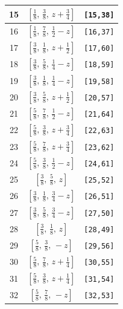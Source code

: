 \documentclass[fleqn,8pt]{jsarticle}
\begin{document}
\begin{longtable}{ccc}
15 & $\left[ \frac{1}{8},\, \frac{3}{8},\, z + \frac{3}{4} \right]$ & {\tt [15,38]} \\ \hline
16 & $\left[ \frac{1}{8},\, \frac{7}{8},\, \frac{1}{2} - z \right]$ & {\tt [16,37]} \\ \hline
17 & $\left[ \frac{3}{8},\, \frac{1}{8},\, z + \frac{1}{2} \right]$ & {\tt [17,60]} \\ \hline
18 & $\left[ \frac{3}{8},\, \frac{5}{8},\, \frac{1}{4} - z \right]$ & {\tt [18,59]} \\ \hline
19 & $\left[ \frac{3}{8},\, \frac{1}{8},\, \frac{1}{4} - z \right]$ & {\tt [19,58]} \\ \hline
20 & $\left[ \frac{3}{8},\, \frac{5}{8},\, z + \frac{1}{2} \right]$ & {\tt [20,57]} \\ \hline
21 & $\left[ \frac{5}{8},\, \frac{7}{8},\, \frac{1}{2} - z \right]$ & {\tt [21,64]} \\ \hline
22 & $\left[ \frac{5}{8},\, \frac{3}{8},\, z + \frac{3}{4} \right]$ & {\tt [22,63]} \\ \hline
23 & $\left[ \frac{5}{8},\, \frac{7}{8},\, z + \frac{3}{4} \right]$ & {\tt [23,62]} \\ \hline
24 & $\left[ \frac{5}{8},\, \frac{3}{8},\, \frac{1}{2} - z \right]$ & {\tt [24,61]} \\ \hline
25 & $\left[ \frac{3}{8},\, \frac{5}{8},\, z \right]$ & {\tt [25,52]} \\ \hline
26 & $\left[ \frac{3}{8},\, \frac{1}{8},\, \frac{3}{4} - z \right]$ & {\tt [26,51]} \\ \hline
27 & $\left[ \frac{3}{8},\, \frac{5}{8},\, \frac{3}{4} - z \right]$ & {\tt [27,50]} \\ \hline
28 & $\left[ \frac{3}{8},\, \frac{1}{8},\, z \right]$ & {\tt [28,49]} \\ \hline
29 & $\left[ \frac{5}{8},\, \frac{3}{8},\, - z \right]$ & {\tt [29,56]} \\ \hline
30 & $\left[ \frac{5}{8},\, \frac{7}{8},\, z + \frac{1}{4} \right]$ & {\tt [30,55]} \\ \hline
31 & $\left[ \frac{5}{8},\, \frac{3}{8},\, z + \frac{1}{4} \right]$ & {\tt [31,54]} \\ \hline
32 & $\left[ \frac{5}{8},\, \frac{7}{8},\, - z \right]$ & {\tt [32,53]} \\
\end{longtable}
\renewcommand{\arraystretch}{1.2}
\end{document}
